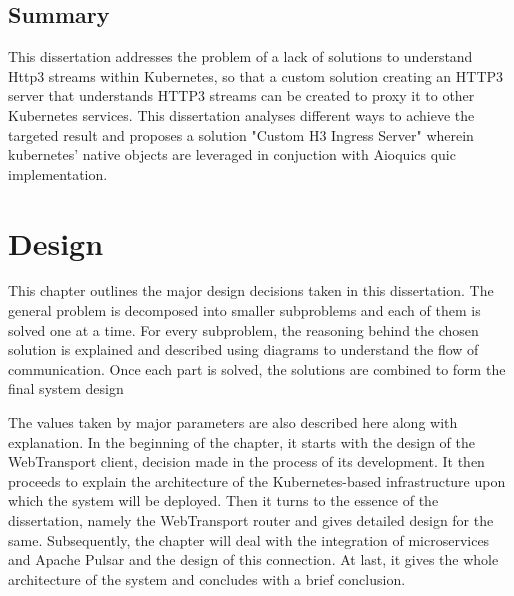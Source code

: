 {\section{Summary}
This dissertation addresses the problem of a lack of solutions to understand Http3 streams within Kubernetes, so that a custom solution creating an HTTP3 server that understands HTTP3 streams can be created to proxy it to other Kubernetes services. This dissertation analyses different ways to achieve the targeted result and proposes a solution "Custom H3 Ingress Server" wherein kubernetes' native objects are leveraged in conjuction with Aioquics quic implementation.


\chapter{Design}
\label{chap:Design}




This chapter outlines the major design decisions taken in this dissertation. The general problem is decomposed into smaller subproblems and each of them is solved one at a time. For every subproblem, the reasoning behind the chosen solution is explained and described using diagrams to understand the flow of communication. Once each part is solved, the solutions are combined to form the final system design

The values taken by major parameters are also described here along with explanation. In the beginning of the chapter, it starts with the design of the WebTransport client, decision made in the process of its development. It then proceeds to explain the architecture of the Kubernetes-based infrastructure upon which the system will be deployed. Then it turns to the essence of the dissertation, namely the WebTransport router and gives detailed design for the same. Subsequently, the chapter will deal with the integration of microservices and Apache Pulsar and the design of this connection. At last, it gives the whole architecture of the system and concludes with a brief conclusion.



}
